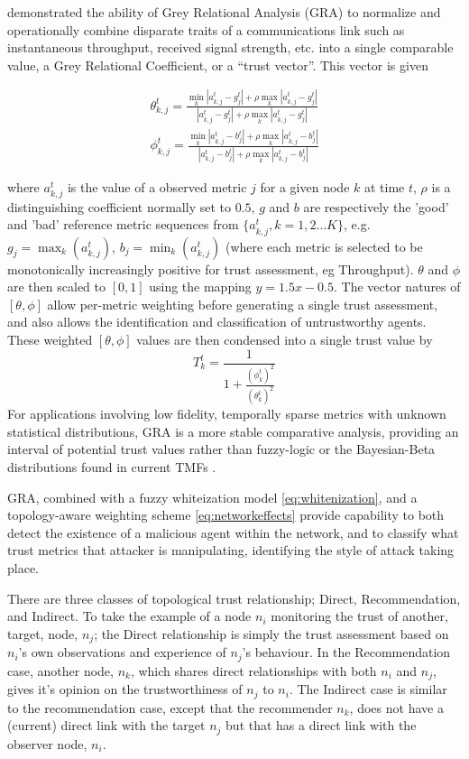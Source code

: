 \documentclass[runningheads,a4paper]{llncs}
\begin{document}
\cite{Guo2012} demonstrated the ability of Grey Relational Analysis (GRA)\cite{Zuo1995} to normalize and operationally combine disparate traits of a communications link such as instantaneous throughput, received signal strength, etc. into a single comparable value, a Grey Relational Coefficient, or a ``trust vector''.
This vector is given

\begin{align}
  \label{eq:grc}
  \theta_{k,j}^t = \frac{\min_k|a_{k,j}^t - g_j^t| + \rho \max_k|a_{k,j}^t-g_j^t|}{|a_{k,j}^t-g_j^t| + \rho \max_k|a_{k,j}^t-g_j^t|} \\
  \phi_{k,j}^t = \frac{\min_k|a_{k,j}^t - b_j^t| + \rho \max_k|a_{k,j}^t-b_j^t|}{|a_{k,j}^t-b_j^t| + \rho \max_k|a_{k,j}^t-b_j^t|}
\end{align}

where $a_{k,j}^t$ is the value of a observed metric $j$ for a given node $k$ at time $t$, $\rho$ is a distinguishing coefficient normally set to $0.5$, $g$ and $b$ are respectively the 'good' and 'bad' reference metric sequences from $\{a_{k,j}^t, k=1,2\dots K\}$, e.g. $g_j=\max_k({a_{k,j}^t})$,  $b_j=\min_k({a_{k,j}^t})$ (where each metric is selected to be monotonically increasingly positive for trust assessment, eg Throughput). $\theta$ and $\phi$ are then scaled to $[0,1]$ using the mapping $y = 1.5 x - 0.5$.
The vector natures of $[\theta,\phi]$ allow per-metric weighting before generating a single trust assessment, and also allows the identification and classification of untrustworthy agents.
These weighted $[\theta,\phi]$ values are then condensed into a single trust value by
\begin{equation}
  \label{eq:trustvalue}
  T_k^t = \frac{1}{1+\frac{(\phi_k^t)^2}{(\theta_k^t)^2}}
\end{equation}
For applications involving low fidelity, temporally sparse metrics with unknown statistical distributions, GRA is a more stable comparative analysis, providing an interval of potential trust values rather than fuzzy-logic or the Bayesian-Beta distributions found in current TMFs \cite{Liu2006}. 

GRA, combined with a fuzzy whiteization model \eqref{eq:whitenization}, and a topology-aware weighting scheme \eqref{eq:networkeffects} provide capability to both detect the existence of a malicious agent within the network, and to classify what trust metrics that attacker is manipulating, identifying the style of attack taking place.

There are three classes of topological trust relationship; Direct, Recommendation, and Indirect.
To take the example of a node $n_i$ monitoring the trust of another, target, node, $n_j$; the Direct relationship is simply the trust assessment based on $n_i$'s own observations and experience of $n_j$'s behaviour.
In the Recommendation case, another node, $n_k$, which shares direct relationships with both $n_i$ and $n_j$, gives it's opinion on the trustworthiness of $n_j$ to $n_i$.
The Indirect case is similar to the recommendation case, except that the recommender $n_k$, does not have a (current) direct link with the target $n_j$ but that has a direct link with the observer node, $n_i$.
\end{document}
